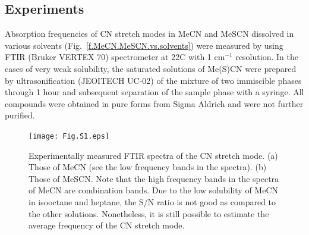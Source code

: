 \documentclass[a4paper,titlepage,twoside,fleqn,12pt]{book}
\begin{document}
\begin{appendices}
\chapter{Experiments\label{a:exp-ftir}}

Absorption frequencies of CN stretch modes in MeCN and MeSCN dissolved in various
solvents (Fig.~\ref{f.MeCN.MeSCN.vs.solvents}) were measured by using FTIR (Bruker VERTEX 70) 
spectrometer at 22{\degree}C with 1 cm$^{-1}$ 
resolution. In the cases of very weak solubility, the saturated solutions of Me(S)CN were 
prepared by ultrasonification (JEOITECH UC-02) of the mixture of two immiscible phases 
through 1 hour and subsequent separation of the sample phase with a syringe. All compounds 
were obtained in pure forms from Sigma Aldrich and were not further purified.
%
\begin{figure}[ht]
\centering
\setlength\fboxsep{0.4pt}
\setlength\fboxrule{0.5pt}
\texttt{[image: Fig.S1.eps]}
\caption{Experimentally measured FTIR spectra of the CN stretch mode. (a) Those of
MeCN (see the low frequency bands in the spectra). (b) Those of MeSCN. Note that the high 
frequency bands in the spectra of MeCN are combination bands. Due to the low solubility of 
MeCN in isooctane and heptane, the S/N ratio is not good as compared to the other solutions. 
Nonetheless, it is still possible to estimate the average frequency of the CN stretch mode.
\label{f.MeCN.MeSCN.vs.solvents.spectra}}
\end{figure}
%



\end{appendices}


%
%
\end{document}
